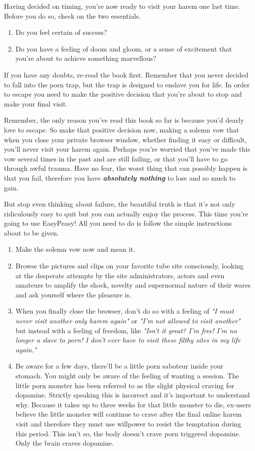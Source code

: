 \documentclass[easypeasy.tex]{subfiles}
\begin{document}
Having decided on timing, you're now ready to visit your harem one last time. Before you do so, check on the two essentials.
\begin{enumerate}
  \item Do you feel certain of success?
  \item Do you have a feeling of doom and gloom, or a sense of excitement that you're about to achieve something marvellous?
\end{enumerate}

If you have any doubts, re-read the book first. Remember that you never decided to fall into the porn trap, but the trap is designed to enslave you for life. In order to escape you need to make the positive decision that you're about to stop and make your final visit.

Remember, the only reason you've read this book so far is because you'd dearly love to escape. So make that positive decision now, making a solemn vow that when you close your private browser window, whether finding it easy or difficult, you'll never visit your harem again. Perhaps you're worried that you've made this vow several times in the past and are still failing, or that you'll have to go through awful trauma. Have no fear, the worst thing that can possibly happen is that you fail, therefore you have \textbf{\textit{absolutely nothing}} to lose and so much to gain.

But stop even thinking about failure, the beautiful truth is that it's not only ridiculously easy to quit but you can actually enjoy the process. This time you're going to use EasyPeasy! All you need to do is follow the simple instructions about to be given.

\begin{enumerate}
  \item Make the solemn vow now and mean it.
  \item Browse the pictures and clips on your favorite tube site consciously, looking at the desperate attempts by the site administrators, actors and even amateurs to amplify the shock, novelty and supernormal nature of their wares and ask yourself where the pleasure is.
  \item When you finally close the browser, don't do so with a feeling of \textit{"I must never visit another only harem again"} or \textit{"I'm not allowed to visit another"} but instead with a feeling of freedom, like \textit{"Isn't it great? I'm free! I'm no longer a slave to porn! I don't ever have to visit these filthy sites in my life again."}
  \item Be aware for a few days, there'll be a little porn saboteur inside your stomach. You might only be aware of the feeling of wanting a session. The little porn monster has been referred to as the slight physical craving for dopamine. Strictly speaking this is incorrect and it's important to understand why. Because it takes up to three weeks for that little monster to die, ex-users believe the little monster will continue to crave after the final online harem visit and therefore they must use willpower to resist the temptation during this period. This isn't so, the body doesn't crave porn triggered dopamine. Only the brain craves dopamine.
\end{enumerate}
\end{document}
